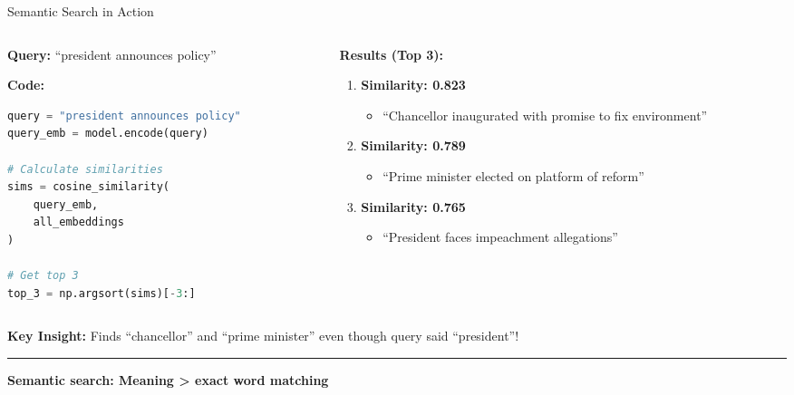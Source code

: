 \documentclass[8pt,aspectratio=169]{beamer}
\newcommand{\bottomnote}[1]{%
\vfill
\vspace{-2mm}
\textcolor{mllavender2}{\rule{\textwidth}{0.4pt}}
\vspace{1mm}
\footnotesize
\textbf{#1}
}
\begin{document}
\begin{frame}[t,fragile]{Semantic Search in Action}

\begin{columns}[t]
\begin{column}{0.45\textwidth}
\textbf{Query:} ``president announces policy''

\vspace{0.3cm}

\textbf{Code:}
\begin{lstlisting}[language=Python]
query = "president announces policy"
query_emb = model.encode(query)

# Calculate similarities
sims = cosine_similarity(
    query_emb,
    all_embeddings
)

# Get top 3
top_3 = np.argsort(sims)[-3:]
\end{lstlisting}
\end{column}

\begin{column}{0.50\textwidth}
\textbf{Results (Top 3):}

\vspace{0.3cm}

\begin{enumerate}
    \item \textbf{Similarity: 0.823}
    \begin{itemize}
        \item[] ``Chancellor inaugurated with promise to fix environment''
    \end{itemize}

    \vspace{0.2cm}

    \item \textbf{Similarity: 0.789}
    \begin{itemize}
        \item[] ``Prime minister elected on platform of reform''
    \end{itemize}

    \vspace{0.2cm}

    \item \textbf{Similarity: 0.765}
    \begin{itemize}
        \item[] ``President faces impeachment allegations''
    \end{itemize}
\end{enumerate}
\end{column}
\end{columns}

\vspace{0.3cm}

\textbf{Key Insight:} Finds ``chancellor'' and ``prime minister'' even though query said ``president''!

\bottomnote{Semantic search: Meaning > exact word matching}
\end{frame}
\end{document}
